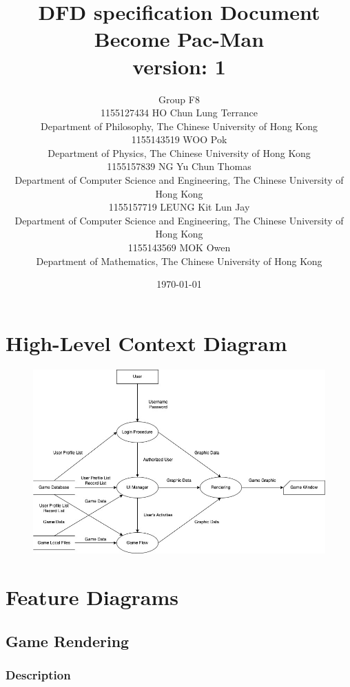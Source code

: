 \documentclass{article}
\title{DFD specification Document\\Become Pac-Man\\version: 1}
\author{Group F8\\1155127434 HO Chun Lung Terrance\\
Department of Philosophy, The Chinese University of Hong Kong\\1155143519 WOO Pok\\
Department of Physics, The Chinese University of Hong Kong\\1155157839 NG Yu Chun Thomas\\
Department of Computer Science and Engineering, The Chinese University of Hong Kong\\1155157719 LEUNG Kit Lun Jay\\
Department of Computer Science and Engineering, The Chinese University of Hong Kong\\1155143569 MOK Owen\\
Department of Mathematics, The Chinese University of Hong Kong}
\date{\today}
\begin{document}
\maketitle
\tableofcontents
\newpage

\section{High-Level Context Diagram}
\begin{figure}[H]
    \centering
    \includegraphics*[scale=0.5]{HLCDFD.jpg}
\end{figure}
\section{Feature Diagrams}
\subsection{Game Rendering}
\subsubsection{Description}
\end{document}
